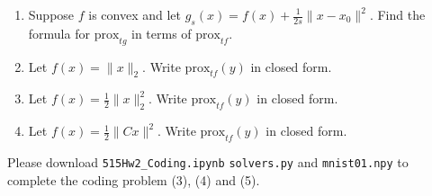 \documentclass[11pt]{amsart}
\newcommand{\prox}{\mathrm{prox}}
\begin{document}
\begin{enumerate}
\begin{enumerate}
\item Suppose $f$ is convex and let $g_s(x) = f(x) + \frac{1}{2s}\|x-x_0\|^2$. 
Find the formula for $\prox_{t g}$ in terms of $\prox_{t f}$. 
\bigskip


\item Let $f(x) = \|x\|_2$. Write $\prox_{tf}(y)$ in closed form.

\bigskip

\item Let $f(x) = \frac{1}{2}\|x\|_2^2$. Write $\prox_{tf}(y)$ in closed form.

\bigskip


\item Let $f(x) = \frac{1}{2}\|Cx\|^2$. Write $\prox_{t f}(y)$ in closed form.



\end{enumerate}
\end{enumerate}

\newpage
{}
\vskip 8pt
Please download \texttt{515Hw2\_Coding.ipynb} \texttt{solvers.py} and \texttt{mnist01.npy} to complete the coding problem (3), (4) and (5).
\end{document}
